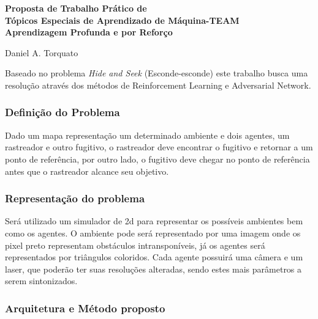 \documentclass[a4paper, 12pt]{article}
\begin{document}
	\thispagestyle{empty}

	\begin{center}
		\sc\bf
		Proposta de Trabalho Prático de\\
		Tópicos Especiais de Aprendizado de Máquina-TEAM\\
		Aprendizagem Profunda e por Reforço

		Daniel A. Torquato
	\end{center}

	Baseado no problema \emph{Hide and Seek} (Esconde-esconde) este trabalho
	busca uma resolução através dos métodos de Reinforcement Learning e
	Adversarial Network.

	\subsubsection*{Definição do Problema}

	Dado um mapa representação um determinado ambiente e dois agentes, um
	rastreador e outro fugitivo, o rastreador deve encontrar o fugitivo e
	retornar a um ponto de referência, por outro lado, o fugitivo deve chegar no
	ponto de referência antes que o rastreador alcance seu objetivo.


	\subsubsection*{Representação do problema}

	Será utilizado um simulador de 2d para representar os possíveis ambientes
	bem como os agentes. O ambiente pode será representado por uma imagem onde
	os pixel preto representam obstáculos intransponíveis, já os agentes será
	representados por triângulos coloridos. Cada agente possuirá uma câmera e um
	laser, que poderão ter suas resoluções alteradas, sendo estes mais 
	parâmetros a serem sintonizados.




	\subsubsection*{Arquitetura e Método proposto}
\end{document}
